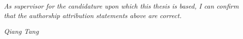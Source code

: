 
\vspace{5cm}



\vspace{2cm}

\emph{As supervisor for the candidature upon which this thesis is based, I can confirm that the authorship attribution statements above are correct.}

\noindent \emph{Qiang Tang}